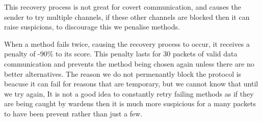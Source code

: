 This recovery process is not great for covert communication, and causes the sender to try multiple channels, if these other channels are blocked then it can raise suspicions, to discourage this we penalise methods.

When a method fails twice, causing the recovery process to occur, it receives a penalty of -90\% to its score. This penalty lasts for 30 packets of valid data communication and prevents the method being chosen again unless there are no better alternatives. The reason we do not permenantly block the protocol is beacuse it can fail for reasons that are temporary, but we cannot know that until we try again, It is not a good idea to constantly retry failing methods as if they are being caught by wardens then it is much more suspicious for a many packets to have been prevent rather than just a few.
